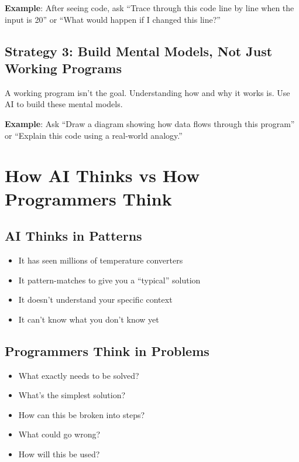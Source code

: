 \documentclass[
  letterpaper,
  DIV=11,
  numbers=noendperiod,
  oneside]{scrreprt}
\providecommand{\tightlist}{%
  \setlength{\itemsep}{0pt}\setlength{\parskip}{0pt}}\usepackage{longtable,booktabs,array}
\begin{document}
\textbf{Example}: After seeing code, ask ``Trace through this code line
by line when the input is 20'' or ``What would happen if I changed this
line?''

\subsection{Strategy 3: Build Mental Models, Not Just Working
Programs}\label{strategy-3-build-mental-models-not-just-working-programs}

A working program isn't the goal. Understanding how and why it works is.
Use AI to build these mental models.

\textbf{Example}: Ask ``Draw a diagram showing how data flows through
this program'' or ``Explain this code using a real-world analogy.''

\section{How AI Thinks vs How Programmers
Think}\label{how-ai-thinks-vs-how-programmers-think}

\subsection{AI Thinks in Patterns}\label{ai-thinks-in-patterns}

\begin{itemize}
\tightlist
\item
  It has seen millions of temperature converters
\item
  It pattern-matches to give you a ``typical'' solution
\item
  It doesn't understand your specific context
\item
  It can't know what you don't know yet
\end{itemize}

\subsection{Programmers Think in
Problems}\label{programmers-think-in-problems}

\begin{itemize}
\tightlist
\item
  What exactly needs to be solved?
\item
  What's the simplest solution?
\item
  How can this be broken into steps?
\item
  What could go wrong?
\item
  How will this be used?
\end{itemize}
\end{document}
